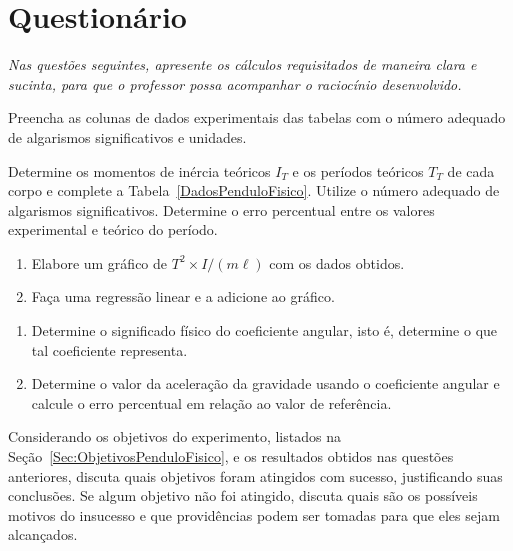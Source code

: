 \vspace{5mm}

\section{Questionário}
\emph{Nas questões seguintes, apresente os cálculos requisitados de maneira clara e sucinta, para que o professor possa acompanhar o raciocínio desenvolvido.}
\vspace{5mm}

\begin{question}[type={exam}]{2}
Preencha as colunas de dados experimentais das tabelas com o número adequado de algarismos significativos e unidades.
\end{question}

\begin{question}[type={exam}]{2}
Determine os momentos de inércia teóricos $I_T$ e os períodos teóricos $T_T$ de cada corpo e complete a Tabela~\ref{DadosPenduloFisico}. Utilize o número adequado de algarismos significativos. Determine o erro percentual entre os valores experimental e teórico do período.
\end{question}

\begin{question}[type={exam}]{2}
\begin{enumerate}[label=\roman*.]
    \item Elabore um gráfico de $T^2 \times I/(m\ell)$ com os dados obtidos.
    \item Faça uma regressão linear e a adicione ao gráfico.
\end{enumerate}
\end{question}

\begin{question}[type={exam}]{2}
\begin{enumerate}[label=\roman*.]
    \item Determine o significado físico do coeficiente angular, isto é, determine o que tal coeficiente representa.
    \item Determine o valor da aceleração da gravidade usando o coeficiente angular e calcule o erro percentual em relação ao valor de referência.
\end{enumerate}
\end{question}

\begin{question}[type={exam}]{2}
Considerando os objetivos do experimento, listados na Seção~\ref{Sec:ObjetivosPenduloFisico}, e os resultados obtidos nas questões anteriores, discuta quais objetivos foram atingidos com sucesso, justificando suas conclusões. Se algum objetivo não foi atingido, discuta quais são os possíveis motivos do insucesso e que providências podem ser tomadas para que eles sejam alcançados.
\end{question}

